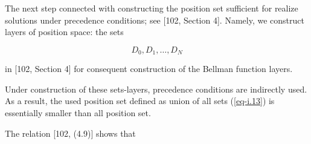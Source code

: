 \documentclass{article}
\begin{document}
The next step connected with constructing the position set
sufficient for realize solutions
under precedence conditions;
see
[102, Section 4].  %
Namely,
we construct layers of position space:
the sets

\begin{equation}
  \label{eq-i.13}
  D_0, D_1, \dots , D_N
\end{equation}

in
[102, Section 4]  %
for consequent construction of the Bellman function layers.

Under construction of these sets-layers,
precedence conditions are indirectly used.
As a result,
the used position set defined as union of all sets (\ref{eq-i.13})
is essentially smaller than all position set.

The relation
[102, (4.9)]  %
shows that
\end{document}
